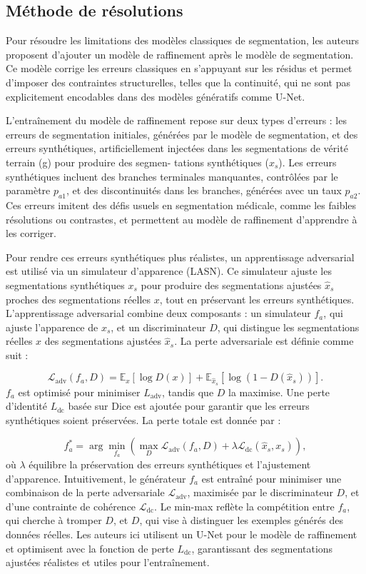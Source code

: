 \documentclass[a4paper,12pt]{article}
\begin{document}
\begin{multicols}{2}
\subsection*{Méthode de résolutions}

Pour résoudre les limitations des modèles classiques de segmentation, les auteurs proposent
d’ajouter un modèle de raffinement après le modèle de segmentation. Ce modèle corrige les
erreurs classiques en s’appuyant sur les résidus et permet d’imposer des contraintes structurelles,
telles que la continuité, qui ne sont pas explicitement encodables dans des modèles génératifs
comme U-Net.

L’entraînement du modèle de raffinement repose sur deux types d’erreurs : les erreurs de
segmentation initiales, générées par le modèle de segmentation, et des erreurs synthétiques,
artificiellement injectées dans les segmentations de vérité terrain (g) pour produire des segmen-
tations synthétiques (\(x_s\)). Les erreurs synthétiques incluent des branches terminales manquantes,
contrôlées par le paramètre \(p_{a1}\), et des discontinuités dans les branches, générées avec un taux \(p_{a2}\).
Ces erreurs imitent des défis usuels en segmentation médicale, comme les faibles résolutions ou
contrastes, et permettent au modèle de raffinement d’apprendre à les corriger.

Pour rendre ces erreurs synthétiques plus réalistes, un apprentissage adversarial est utilisé via
un simulateur d’apparence (LASN). Ce simulateur ajuste les segmentations synthétiques \(x_s\) pour
produire des segmentations ajustées \(\hat{x}_s\) proches des segmentations réelles \(x\), tout en préservant
les erreurs synthétiques. L’apprentissage adversarial combine deux composants : un simulateur
\(f_a\), qui ajuste l’apparence de \(x_s\), et un discriminateur \(D\), qui distingue les segmentations réelles
\(x\) des segmentations ajustées \(\hat{x}_s\). La perte adversariale est définie comme suit :

\[
\mathcal{L}_{\text{adv}}(f_a, D) = \mathbb{E}_{x}[\log D(x)] + \mathbb{E}_{\hat{x}_s}[\log(1-D(\hat{x}_s))].
\]
\(f_a\) est optimisé pour minimiser \(L_{\text{adv}}\), tandis que \(D\) la maximise. Une perte d’identité \(L_{\text{dc}}\) basée sur Dice est ajoutée pour garantir que les erreurs synthétiques soient préservées. La perte totale est donnée par :

\[
f_a^* = \arg \min_{f_a} \left(\max_{D} \mathcal{L}_{\text{adv}}(f_a, D) + \lambda \mathcal{L}_{\text{dc}}(\hat{x}_s, x_s)\right),
\]
où \(\lambda\) équilibre la préservation des erreurs synthétiques et l’ajustement d’apparence. Intuitivement, le générateur \(f_a\) est entraîné pour minimiser une combinaison de la perte adversariale \(\mathcal{L}_{\text{adv}}\), maximisée par le discriminateur \(D\), et d'une contrainte de cohérence \(\mathcal{L}_{\text{dc}}\). Le min-max reflète la compétition entre \(f_a\), qui cherche à tromper \(D\), et \(D\), qui vise à distinguer les exemples générés des données réelles. Les auteurs ici
utilisent un U-Net pour le modèle de raffinement et optimisent avec la fonction de perte \(L_{\text{dc}}\),
garantissant des segmentations ajustées réalistes et utiles pour l’entraînement. 


\end{multicols}
\end{document}
